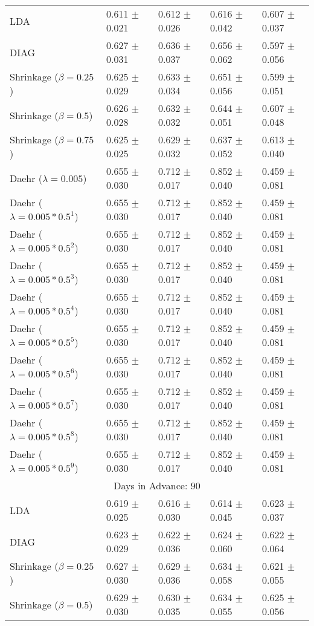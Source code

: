 \begin{table}
\begin{tabular}{*{5}{l}}
LDA&0.611 $\pm$ 0.021&0.612 $\pm$ 0.026&0.616 $\pm$ 0.042&0.607 $\pm$ 0.037\\
DIAG&0.627 $\pm$ 0.031&0.636 $\pm$ 0.037&0.656 $\pm$ 0.062&0.597 $\pm$ 0.056\\
Shrinkage ($\beta=0.25$)&0.625 $\pm$ 0.029&0.633 $\pm$ 0.034&0.651 $\pm$ 0.056&0.599 $\pm$ 0.051\\
Shrinkage ($\beta=0.5$)&0.626 $\pm$ 0.028&0.632 $\pm$ 0.032&0.644 $\pm$ 0.051&0.607 $\pm$ 0.048\\
Shrinkage ($\beta=0.75$)&0.625 $\pm$ 0.025&0.629 $\pm$ 0.032&0.637 $\pm$ 0.052&0.613 $\pm$ 0.040\\
Daehr ($\lambda=0.005$)&0.655 $\pm$ 0.030&0.712 $\pm$ 0.017&0.852 $\pm$ 0.040&0.459 $\pm$ 0.081\\
Daehr ($\lambda=0.005*0.5^1$)&0.655 $\pm$ 0.030&0.712 $\pm$ 0.017&0.852 $\pm$ 0.040&0.459 $\pm$ 0.081\\
Daehr ($\lambda=0.005*0.5^2$)&0.655 $\pm$ 0.030&0.712 $\pm$ 0.017&0.852 $\pm$ 0.040&0.459 $\pm$ 0.081\\
Daehr ($\lambda=0.005*0.5^3$)&0.655 $\pm$ 0.030&0.712 $\pm$ 0.017&0.852 $\pm$ 0.040&0.459 $\pm$ 0.081\\
Daehr ($\lambda=0.005*0.5^4$)&0.655 $\pm$ 0.030&0.712 $\pm$ 0.017&0.852 $\pm$ 0.040&0.459 $\pm$ 0.081\\
Daehr ($\lambda=0.005*0.5^5$)&0.655 $\pm$ 0.030&0.712 $\pm$ 0.017&0.852 $\pm$ 0.040&0.459 $\pm$ 0.081\\
Daehr ($\lambda=0.005*0.5^6$)&0.655 $\pm$ 0.030&0.712 $\pm$ 0.017&0.852 $\pm$ 0.040&0.459 $\pm$ 0.081\\
Daehr ($\lambda=0.005*0.5^7$)&0.655 $\pm$ 0.030&0.712 $\pm$ 0.017&0.852 $\pm$ 0.040&0.459 $\pm$ 0.081\\
Daehr ($\lambda=0.005*0.5^8$)&0.655 $\pm$ 0.030&0.712 $\pm$ 0.017&0.852 $\pm$ 0.040&0.459 $\pm$ 0.081\\
Daehr ($\lambda=0.005*0.5^9$)&0.655 $\pm$ 0.030&0.712 $\pm$ 0.017&0.852 $\pm$ 0.040&0.459 $\pm$ 0.081\\
\hline\multicolumn{5}{c}{  Days in Advance: 90}\\\hline
LDA&0.619 $\pm$ 0.025&0.616 $\pm$ 0.030&0.614 $\pm$ 0.045&0.623 $\pm$ 0.037\\
DIAG&0.623 $\pm$ 0.029&0.622 $\pm$ 0.036&0.624 $\pm$ 0.060&0.622 $\pm$ 0.064\\
Shrinkage ($\beta=0.25$)&0.627 $\pm$ 0.030&0.629 $\pm$ 0.036&0.634 $\pm$ 0.058&0.621 $\pm$ 0.055\\
Shrinkage ($\beta=0.5$)&0.629 $\pm$ 0.030&0.630 $\pm$ 0.035&0.634 $\pm$ 0.055&0.625 $\pm$ 0.056\\

\end{tabular}
\end{table}
